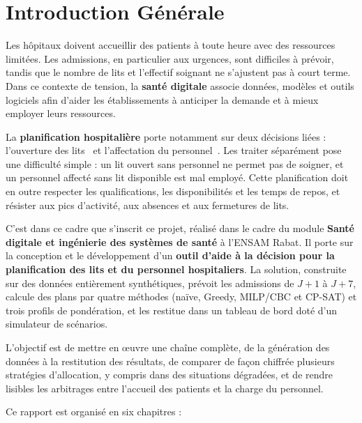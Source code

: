 \chapter*{Introduction Générale}
\begingroup
\setlength{\parindent}{1.2em}
\setlength{\parskip}{3pt}

\indent Les hôpitaux doivent accueillir des patients à toute heure avec des ressources limitées. Les admissions, en particulier aux urgences, sont difficiles à prévoir, tandis que le nombre de lits et l'effectif soignant ne s'ajustent pas à court terme. Dans ce contexte de tension, la \textbf{santé digitale} associe données, modèles et outils logiciels afin d'aider les établissements à anticiper la demande et à mieux employer leurs ressources.

\indent La \textbf{planification hospitalière} porte notamment sur deux décisions liées : l'ouverture des lits~\cite{hulshof2012,hallbeds} et l'affectation du personnel~\cite{burke2004}. Les traiter séparément pose une difficulté simple : un lit ouvert sans personnel ne permet pas de soigner, et un personnel affecté sans lit disponible est mal employé. Cette planification doit en outre respecter les qualifications, les disponibilités et les temps de repos, et résister aux pics d'activité, aux absences et aux fermetures de lits.

\indent C'est dans ce cadre que s'inscrit ce projet, réalisé dans le cadre du module \textbf{Santé digitale et ingénierie des systèmes de santé} à l'ENSAM Rabat. Il porte sur la conception et le développement d'un \textbf{outil d'aide à la décision pour la planification des lits et du personnel hospitaliers}. La solution, construite sur des données entièrement synthétiques, prévoit les admissions de $J+1$ à $J+7$, calcule des plans par quatre méthodes (naïve, Greedy, MILP/CBC et CP-SAT) et trois profils de pondération, et les restitue dans un tableau de bord doté d'un simulateur de scénarios.

\indent L'objectif est de mettre en œuvre une chaîne complète, de la génération des données à la restitution des résultats, de comparer de façon chiffrée plusieurs stratégies d'allocation, y compris dans des situations dégradées, et de rendre lisibles les arbitrages entre l'accueil des patients et la charge du personnel.

\indent Ce rapport est organisé en six chapitres :

